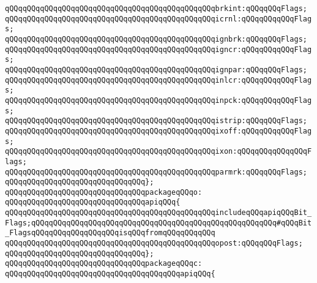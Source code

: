 \newline
\verb|qQQqqQQqqQQqqQQqqQQqqQQqqQQqqQQqqQQqqQQqqQQqqQQqbrkint:qQQqqQQqFlags;|\newline
\verb|qQQqqQQqqQQqqQQqqQQqqQQqqQQqqQQqqQQqqQQqqQQqqQQqicrnl:qQQqqQQqqQQqFlags;|\newline
\verb|qQQqqQQqqQQqqQQqqQQqqQQqqQQqqQQqqQQqqQQqqQQqqQQqignbrk:qQQqqQQqFlags;|\newline
\verb|qQQqqQQqqQQqqQQqqQQqqQQqqQQqqQQqqQQqqQQqqQQqqQQqigncr:qQQqqQQqqQQqFlags;|\newline
\verb|qQQqqQQqqQQqqQQqqQQqqQQqqQQqqQQqqQQqqQQqqQQqqQQqignpar:qQQqqQQqFlags;|\newline
\verb|qQQqqQQqqQQqqQQqqQQqqQQqqQQqqQQqqQQqqQQqqQQqqQQqinlcr:qQQqqQQqqQQqFlags;|\newline
\verb|qQQqqQQqqQQqqQQqqQQqqQQqqQQqqQQqqQQqqQQqqQQqqQQqinpck:qQQqqQQqqQQqFlags;|\newline
\verb|qQQqqQQqqQQqqQQqqQQqqQQqqQQqqQQqqQQqqQQqqQQqqQQqistrip:qQQqqQQqFlags;|\newline
\verb|qQQqqQQqqQQqqQQqqQQqqQQqqQQqqQQqqQQqqQQqqQQqqQQqixoff:qQQqqQQqqQQqFlags;|\newline
\verb|qQQqqQQqqQQqqQQqqQQqqQQqqQQqqQQqqQQqqQQqqQQqqQQqixon:qQQqqQQqqQQqqQQqFlags;|\newline
\verb|qQQqqQQqqQQqqQQqqQQqqQQqqQQqqQQqqQQqqQQqqQQqqQQqparmrk:qQQqqQQqFlags;|\newline
\verb|qQQqqQQqqQQqqQQqqQQqqQQqqQQqqQQq};|\newline
\newline
\verb|qQQqqQQqqQQqqQQqqQQqqQQqqQQqqQQqpackageqQQqo:|\newline
\verb|qQQqqQQqqQQqqQQqqQQqqQQqqQQqqQQqapiqQQq{|\newline
\verb|qQQqqQQqqQQqqQQqqQQqqQQqqQQqqQQqqQQqqQQqqQQqqQQqincludeqQQqapiqQQqBit_Flags;qQQqqQQqqQQqqQQqqQQqqQQqqQQqqQQqqQQqqQQqqQQqqQQqqQQqqQQq#qQQqBit_FlagsqQQqqQQqqQQqqQQqqQQqisqQQqfromqQQqqQQqqQQq|\newline
\newline
\verb|qQQqqQQqqQQqqQQqqQQqqQQqqQQqqQQqqQQqqQQqqQQqqQQqopost:qQQqqQQqFlags;|\newline
\verb|qQQqqQQqqQQqqQQqqQQqqQQqqQQqqQQq};|\newline
\newline
\verb|qQQqqQQqqQQqqQQqqQQqqQQqqQQqqQQqpackageqQQqc:|\newline
\verb|qQQqqQQqqQQqqQQqqQQqqQQqqQQqqQQqqQQqqQQqapiqQQq{|\newline
